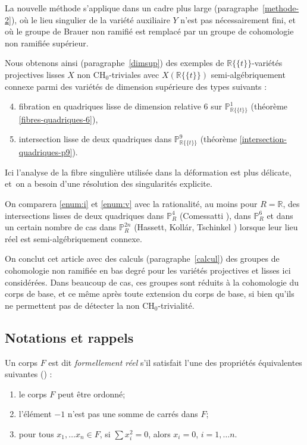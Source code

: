 \documentclass[JEP,XML,SOM,Unicode,francais,published]{cedram}
\newenvironment{enumeratei}
{\bgroup\def\theenumi{\roman{enumi}}\def\theenumii{\arabic{enumii}}\begin{enumerate}}
{\end{enumerate}\egroup}
\newcommand{\CH}{\mathrm{CH}}
\theoremstyle{definition}
\newcommand{\R}{\mathbb R}
\renewcommand{\P}{\mathbb P}
\newcommand{\puiseux}{\mathbb{R}\{\!\{t\}\!\}}
\begin{document}
\medskip

La nouvelle méthode s'applique dans un cadre plus large (paragraphe~\ref{methode-2}),
où le lieu singulier de la variété auxiliaire $Y$ n'est pas
nécessairement fini, et où le groupe de Brauer non ramifié est remplacé par un groupe de cohomologie non ramifiée supérieur.

Nous obtenons ainsi (paragraphe~\ref{dimsup}) des exemples de $\puiseux$-variétés projectives lisses $X$ non $\CH_0$-triviales avec $X(\puiseux)$ semi-algébriquement connexe
parmi des variétés de dimension supérieure des types suivants :
\begin{enumeratei}\setcounter{enumi}{3}
\item\label{enum:iv} fibration en quadriques lisse de dimension relative $6$ sur $\P^1_{\puiseux}$ (théorème \ref{fibres-quadriques-6}),
\item\label{enum:v} intersection lisse de deux quadriques dans $\P^9_{\puiseux}$ (théorème \ref{intersection-quadriques-p9}).
\end{enumeratei}

Ici l'analyse de la fibre singulière utilisée dans la déformation est plus délicate, et~on a besoin d'une résolution des singularités explicite.

On comparera \eqref{enum:i} et \eqref{enum:v} avec la rationalité, au moins pour $R=\R$, des intersections lisses de deux quadriques dans $\P^4_R$ (Comessatti \cite{comessatti1912fondamenti}), dans $\P^6_{R}$ et dans
un certain nombre de cas dans $\P^{2n}_R$ (Hassett, Kollár, Tschinkel \cite{hassett2022rationality}) lorsque leur lieu réel est semi-algébriquement connexe.

On conclut cet article avec des calculs (paragraphe~\ref{calcul}) des groupes de cohomologie non ramifiée en bas degré pour les variétés projectives et lisses ici considérées. Dans beaucoup de cas, ces groupes sont réduits à la cohomologie du corps de base, et ce même
après toute extension du corps de base,
si bien qu'ils ne permettent pas de détecter la non $\CH_0$-trivialité.

\subsection*{Notations et rappels}
Un corps $F$ est dit {\it formellement réel} s'il satisfait l'une des propriétés équivalentes suivantes (\cf \cite[Th.\,1.1.8]{bochnak1998real}) :
\begin{enumeratei}
\item
le corps $F$ peut être ordonné;
\item
l'élément $-1$ n'est pas une somme de carrés dans $F$;
\item
pour tous $x_1,\ldots x_n\in F$, si $\sum x_i^2=0$, alors $x_i=0$, $i=1,\ldots n$.
\end{enumeratei}
\end{document}
